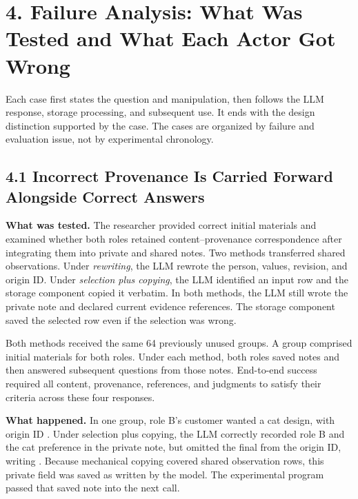 \documentclass[10pt,a4paper]{article}
\begin{document}
\section{4. Failure Analysis: What Was Tested and What Each Actor Got Wrong}\label{two-role-failure-design-failure-analysis-what-was-tested-and-what-each-actor-got-wrong}

Each case first states the question and manipulation, then follows the LLM response, storage processing, and subsequent use. It ends with the design distinction supported by the case. The cases are organized by failure and evaluation issue, not by experimental chronology.

\subsection{4.1 Incorrect Provenance Is Carried Forward Alongside Correct Answers}\label{two-role-failure-design-incorrect-provenance-is-carried-forward-alongside-correct-answers}

\textbf{What was tested.} The researcher provided correct initial materials and examined whether both roles retained content--provenance correspondence after integrating them into private and shared notes. Two methods transferred shared observations. Under \emph{rewriting}, the LLM rewrote the person, values, revision, and origin ID. Under \emph{selection plus copying}, the LLM identified an input row and the storage component copied it verbatim. In both methods, the LLM still wrote the private note and declared current evidence references. The storage component saved the selected row even if the selection was wrong.

Both methods received the same 64 previously unused groups. A group comprised initial materials for both roles. Under each method, both roles saved notes and then answered subsequent questions from those notes. End-to-end success required all content, provenance, references, and judgments to satisfy their criteria across these four responses.

\textbf{What happened.} In one group, role B's customer wanted a cat design, with origin ID \texttt{}. Under selection plus copying, the LLM correctly recorded role B and the cat preference in the private note, but omitted the final \texttt{} from the origin ID, writing \texttt{}. Because mechanical copying covered shared observation rows, this private field was saved as written by the model. The experimental program passed that saved note into the next call.
\end{document}
